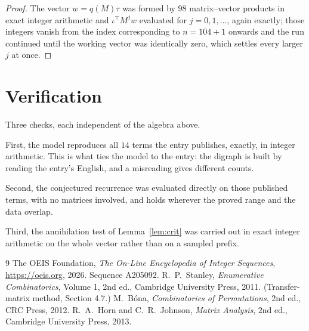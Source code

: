 \documentclass[11pt,a4paper]{article}
\theoremstyle{plain}
\theoremstyle{definition}
\begin{document}
\begin{proof}
The vector $w=q(M)\tau$ was formed by $98$ matrix--vector products in exact integer
arithmetic and $\iota^{\!\top}M^{j}w$ evaluated for $j=0,1,\dots$, again exactly; those
integers vanish from the index corresponding to $n=104+1$ onwards and the run continued
until the working vector was identically zero, which settles every larger $j$ at once.
\end{proof}

\section{Verification}

Three checks, each independent of the algebra above.

First, the model reproduces all $14$ terms the entry publishes, exactly, in integer
arithmetic. This is what ties the model to the entry: the digraph is built by reading the
entry's English, and a misreading gives different counts.

Second, the conjectured recurrence was evaluated directly on those published terms, with no
matrices involved, and holds wherever the proved range and the data overlap.

Third, the annihilation test of Lemma~\ref{lem:crit} was carried out in exact integer
arithmetic on the whole vector rather than on a sampled prefix.

\begin{thebibliography}{9}
 The OEIS Foundation, \emph{The On-Line Encyclopedia of Integer
Sequences}, \url{https://oeis.org}, 2026. Sequence A205092.
 R.~P.~Stanley, \emph{Enumerative Combinatorics}, Volume 1, 2nd ed.,
Cambridge University Press, 2011. (Transfer-matrix method, Section 4.7.)
 M.~B\'ona, \emph{Combinatorics of Permutations}, 2nd ed., CRC
Press, 2012.
 R.~A.~Horn and C.~R.~Johnson, \emph{Matrix Analysis}, 2nd ed., Cambridge
University Press, 2013.
\end{thebibliography}
\end{document}
